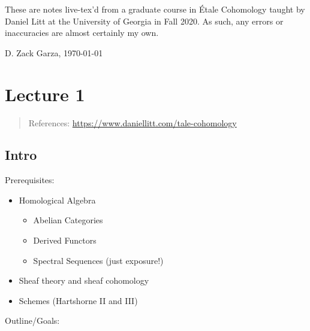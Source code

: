 \newpage

\tableofcontents
\newpage

These are notes live-tex'd from a graduate course in Étale Cohomology
taught by Daniel Litt at the University of Georgia in Fall 2020. As
such, any errors or inaccuracies are almost certainly my own.

\medskip
\begin{flushright}
  D. Zack Garza, \today \\
  \currenttime
\end{flushright}

\hypertarget{lecture-1}{%
\section{Lecture 1}\label{lecture-1}}

\begin{quote}
References: \url{https://www.daniellitt.com/tale-cohomology}
\end{quote}

\hypertarget{intro}{%
\subsection{Intro}\label{intro}}

Prerequisites:

\begin{itemize}
\tightlist
\item
  Homological Algebra

  \begin{itemize}
  \tightlist
  \item
    Abelian Categories
  \item
    Derived Functors
  \item
    Spectral Sequences (just exposure!)
  \end{itemize}
\item
  Sheaf theory and sheaf cohomology
\item
  Schemes (Hartshorne II and III)
\end{itemize}

Outline/Goals:

